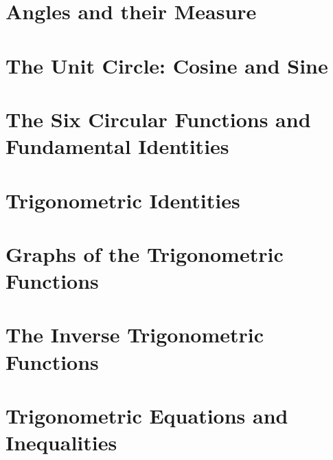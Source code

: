 \section{Angles and their Measure}



\newpage

\section{The Unit Circle: Cosine and Sine}



\newpage

\section{The Six Circular Functions and Fundamental Identities}



\newpage

\section{Trigonometric Identities}



\newpage

\section{Graphs of the Trigonometric Functions}



\newpage

\section{The Inverse Trigonometric Functions}



\newpage

\section{Trigonometric Equations and Inequalities}



\newpage